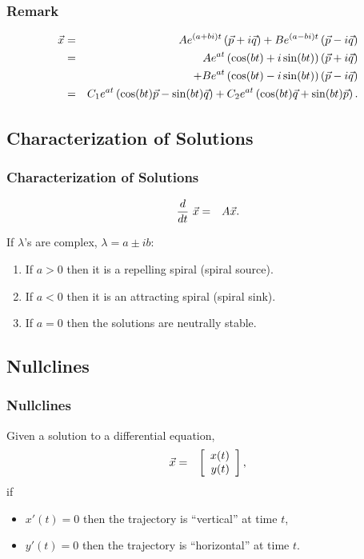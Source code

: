 \begin{frame}
  \frametitle{Remark}

  \begin{eqnarray*}
    \vec{x} & = & Ae^{(a+bi)t} \lp \vec{p} + i \vec{q} \rp 
             + Be^{(a-bi)t}\lp \vec{p} - i \vec{q} \rp \\
    & = & Ae^{at} \lp \cos(bt) + i \sin(bt) \rp \lp \vec{p} + i \vec{q} \rp \\
    & & + Be^{at}\lp \cos(bt) - i \sin(bt) \rp \lp \vec{p} - i \vec{q} \rp \\
  & = & C_1 e^{at} \lp \cos(bt) \vec{p} - \sin(bt) \vec{q} \rp
  + C_2 e^{at} \lp \cos(bt) \vec{q} + \sin(bt) \vec{p} \rp.
  \end{eqnarray*}

\end{frame}



\subsection{Characterization of Solutions}

\begin{frame}
  \frametitle{Characterization of Solutions}

  \begin{eqnarray*}
    \deriv{~}{t} \vec{x} & = & A \vec{x}.
  \end{eqnarray*}

  If $\lambda$'s are complex, $\lambda = a \pm ib$:
  \begin{enumerate}
  \item If $a>0$ then it is a repelling spiral (spiral source).
  \item If $a<0$ then it is an attracting spiral (spiral sink).
  \item If $a=0$ then the solutions are neutrally stable.
  \end{enumerate}

\end{frame}


\subsection{Nullclines}

\begin{frame}
  \frametitle{Nullclines}

  Given a solution to a differential equation,
  \begin{eqnarray*}
    \vec{x} & = & \vecTwo{x(t)}{y(t)},
  \end{eqnarray*}
  if
  \begin{itemize}
  \item $x'(t)=0$ then the trajectory is ``vertical'' at time $t$,
  \item $y'(t)=0$ then the trajectory is ``horizontal'' at time $t$.
  \end{itemize}

\end{frame}


